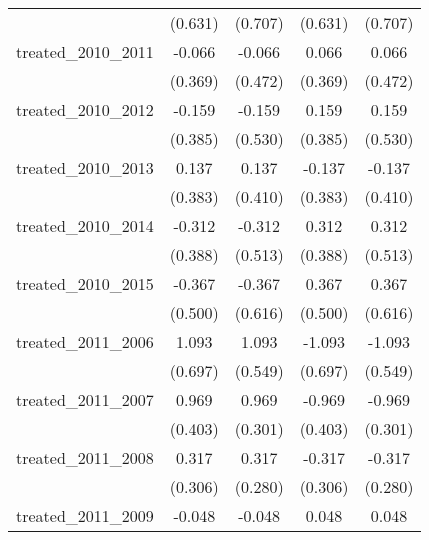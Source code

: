 {\begin{tabular}{l*{4}{c}}
            &     (0.631)         &     (0.707)         &     (0.631)         &     (0.707)         \\
[1em]
treated\_2010\_2011&      -0.066         &      -0.066         &       0.066         &       0.066         \\
            &     (0.369)         &     (0.472)         &     (0.369)         &     (0.472)         \\
[1em]
treated\_2010\_2012&      -0.159         &      -0.159         &       0.159         &       0.159         \\
            &     (0.385)         &     (0.530)         &     (0.385)         &     (0.530)         \\
[1em]
treated\_2010\_2013&       0.137         &       0.137         &      -0.137         &      -0.137         \\
            &     (0.383)         &     (0.410)         &     (0.383)         &     (0.410)         \\
[1em]
treated\_2010\_2014&      -0.312         &      -0.312         &       0.312         &       0.312         \\
            &     (0.388)         &     (0.513)         &     (0.388)         &     (0.513)         \\
[1em]
treated\_2010\_2015&      -0.367         &      -0.367         &       0.367         &       0.367         \\
            &     (0.500)         &     (0.616)         &     (0.500)         &     (0.616)         \\
[1em]
treated\_2011\_2006&       1.093         &       1.093\sym{*}  &      -1.093         &      -1.093\sym{*}  \\
            &     (0.697)         &     (0.549)         &     (0.697)         &     (0.549)         \\
[1em]
treated\_2011\_2007&       0.969\sym{*}  &       0.969\sym{**} &      -0.969\sym{*}  &      -0.969\sym{**} \\
            &     (0.403)         &     (0.301)         &     (0.403)         &     (0.301)         \\
[1em]
treated\_2011\_2008&       0.317         &       0.317         &      -0.317         &      -0.317         \\
            &     (0.306)         &     (0.280)         &     (0.306)         &     (0.280)         \\
[1em]
treated\_2011\_2009&      -0.048         &      -0.048         &       0.048         &       0.048         \\

\end{tabular}}
